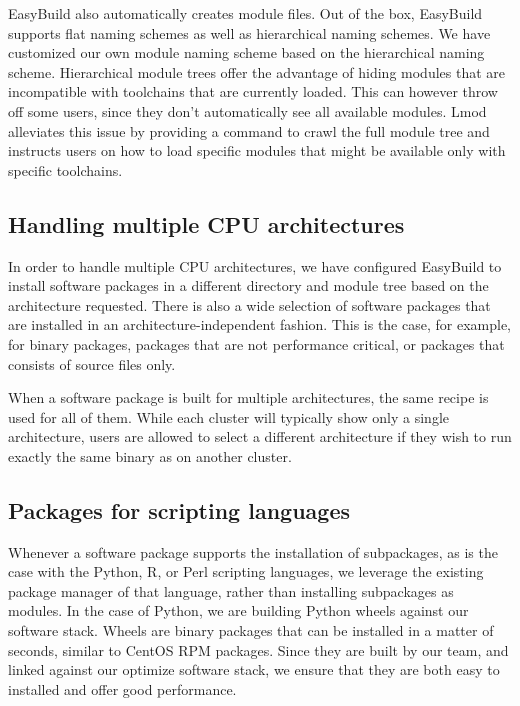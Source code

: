 \documentclass[sigconf]{acmart}
\begin{document}
EasyBuild also automatically creates module files. Out of the box, EasyBuild supports flat naming schemes as well as
hierarchical naming schemes. We have customized our own module naming scheme based on the hierarchical naming scheme.
Hierarchical module trees offer the advantage of hiding modules that are incompatible with toolchains that are
currently loaded. This can however throw off some users, since they don’t automatically see all available modules. Lmod
\cite{Lmod} alleviates this issue by providing a command to crawl the full module tree and instructs users on how to
load specific modules that might be available only with specific toolchains.


\subsection{Handling multiple CPU architectures}
\label{sub:Handling_multiple_CPU_architectures}
In order to handle multiple CPU architectures, we have configured EasyBuild to install software packages in a different
directory and module tree based on the architecture requested. There is also a wide selection of software packages that
are installed in an architecture-independent fashion. This is the case, for example, for binary packages, packages that
are not performance critical, or packages that consists of source files only.

When a software package is built for multiple architectures, the same recipe is used for all of them. While each
cluster will typically show only a single architecture, users are allowed to select a different architecture if they
wish to run exactly the same binary as on another cluster.

\subsection{Packages for scripting languages}
\label{sub:Packages_for_scripting_languages}
Whenever a software package supports the installation of subpackages, as is the case with the Python, R, or Perl
scripting languages, we leverage the existing package manager of that language, rather than installing subpackages as
modules. In the case of Python, we are building Python wheels \cite{Wheels} against our software stack. Wheels are
binary packages that can be installed in a matter of seconds, similar to CentOS RPM packages. Since they are built by
our team, and linked against our optimize software stack, we ensure that they are both easy to installed and offer good
performance.
\end{document}
